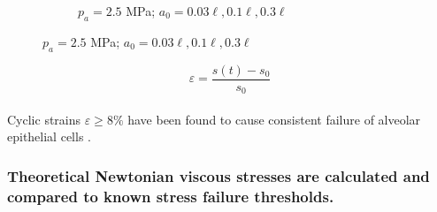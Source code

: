 \begin{frame}
\begin{figure}
\begin{subfigure}[b]{0.5\textwidth}
      \caption{\label{fig:strain_multi-a0-A25} $p_a=2.5$ MPa; $a_0=0.03\ell, 0.1\ell, 0.3\ell$}
    \end{subfigure}
  \end{figure}
  \vspace*{-0.25cm}
  $$\varepsilon = \frac{s(t) - s_0}{s_0}$$\\
  Cyclic strains $\varepsilon\geq 8\%$ have been found to cause consistent failure
  of alveolar epithelial cells \cite{Belete2010}.
\end{frame}
% 
% 
\begin{frame}
  \frametitle{Theoretical Newtonian viscous stresses are calculated and compared to known stress failure thresholds.}
\end{frame}

